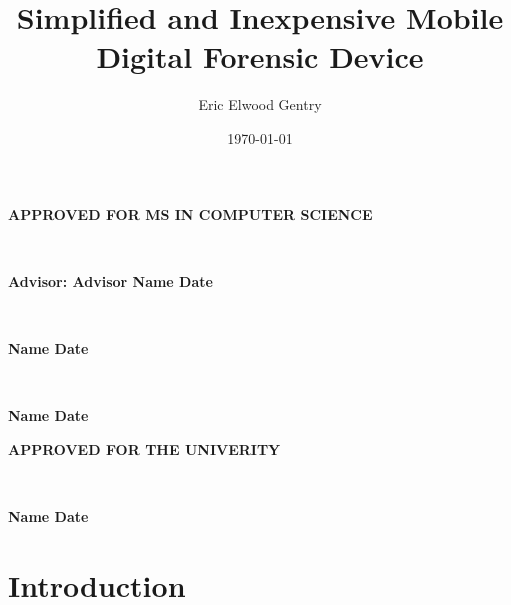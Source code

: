 \documentclass[12pt]{article}
\begin{document}
\begin{center}
{\large \bfseries APPROVED FOR MS IN COMPUTER SCIENCE \par}

\vspace{1.5 cm}

\hrulefill\\
{\large \bfseries Advisor: Advisor Name \hfill Date \par}

\vspace{1.5 cm}

\hrulefill\\
{\large \bfseries Name \hfill Date \par}

\vspace{1.5 cm}

\hrulefill\\
{\large \bfseries Name \hfill Date \par}

\vspace{3 cm}

{\large \bfseries APPROVED FOR THE UNIVERITY \par}

\vspace{1.5 cm}

\hrulefill\\
{\large \bfseries Name \hfill Date \par}
\end{center}

\newpage



\newpage

\title{Simplified and Inexpensive Mobile Digital Forensic Device} 
\author{Eric Elwood Gentry}

\date{\today}
\maketitle

\begin{abstract}
\end{abstract}

\newpage
{}

\tableofcontents

\newpage

\listoffigures

\newpage
{}

\section{Introduction}
\label{sect-intro}
\end{document}
